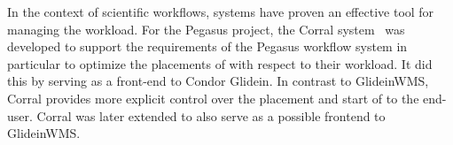 \documentclass{sig-alternate}
\begin{document}

In the context of scientific workflows, \pilotjob systems have proven
an effective tool for managing the workload.
For the Pegasus project, the Corral
system~\cite{Rynge:2011:EUG:2116259.2116599} was developed to support the
requirements of the Pegasus workflow system in particular to optimize the
placements of \pilots with respect to their workload.
It did this by serving as a front-end to Condor Glidein.
In contrast to GlideinWMS, Corral provides more explicit control over the
placement and start of \pilots to the end-user.
Corral was later extended to also serve as a possible frontend to GlideinWMS.
\end{document}
